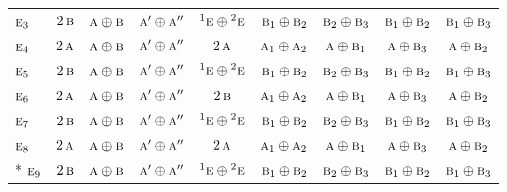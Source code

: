 \documentclass[10pt,a4paper]{article}
\numberwithin{equation}{section}
\newcommand{\irr}[1]{\text{\normalfont\scshape #1}}
\newcommand{\conjpair}[1]{{}^{#1}}
\begin{document}
{\begin{longtable}{@{}lcccccccc@{}}
$\irr{e}_{3}$ & $2\,\irr{b}$ & $\irr{a}\oplus \irr{b}$ & $\irr{a}'\oplus \irr{a}''$ & $\conjpair{1}\irr{e}\oplus \conjpair{2}\irr{e}$ & $\irr{b}_{1}\oplus \irr{b}_{2}$ & $\irr{b}_{2}\oplus \irr{b}_{3}$ & $\irr{b}_{1}\oplus \irr{b}_{2}$ & $\irr{b}_{1}\oplus \irr{b}_{3}$\\
$\irr{e}_{4}$ & $2\,\irr{a}$ & $\irr{a}\oplus \irr{b}$ & $\irr{a}'\oplus \irr{a}''$ & $2\,\irr{a}$ & $\irr{a}_{1}\oplus \irr{a}_{2}$ & $\irr{a}\oplus \irr{b}_{1}$ & $\irr{a}\oplus \irr{b}_{3}$ & $\irr{a}\oplus \irr{b}_{2}$\\
$\irr{e}_{5}$ & $2\,\irr{b}$ & $\irr{a}\oplus \irr{b}$ & $\irr{a}'\oplus \irr{a}''$ & $\conjpair{1}\irr{e}\oplus \conjpair{2}\irr{e}$ & $\irr{b}_{1}\oplus \irr{b}_{2}$ & $\irr{b}_{2}\oplus \irr{b}_{3}$ & $\irr{b}_{1}\oplus \irr{b}_{2}$ & $\irr{b}_{1}\oplus \irr{b}_{3}$\\
$\irr{e}_{6}$ & $2\,\irr{a}$ & $\irr{a}\oplus \irr{b}$ & $\irr{a}'\oplus \irr{a}''$ & $2\,\irr{b}$ & $\irr{a}_{1}\oplus \irr{a}_{2}$ & $\irr{a}\oplus \irr{b}_{1}$ & $\irr{a}\oplus \irr{b}_{3}$ & $\irr{a}\oplus \irr{b}_{2}$\\
$\irr{e}_{7}$ & $2\,\irr{b}$ & $\irr{a}\oplus \irr{b}$ & $\irr{a}'\oplus \irr{a}''$ & $\conjpair{1}\irr{e}\oplus \conjpair{2}\irr{e}$ & $\irr{b}_{1}\oplus \irr{b}_{2}$ & $\irr{b}_{2}\oplus \irr{b}_{3}$ & $\irr{b}_{1}\oplus \irr{b}_{2}$ & $\irr{b}_{1}\oplus \irr{b}_{3}$\\
$\irr{e}_{8}$ & $2\,\irr{a}$ & $\irr{a}\oplus \irr{b}$ & $\irr{a}'\oplus \irr{a}''$ & $2\,\irr{a}$ & $\irr{a}_{1}\oplus \irr{a}_{2}$ & $\irr{a}\oplus \irr{b}_{1}$ & $\irr{a}\oplus \irr{b}_{3}$ & $\irr{a}\oplus \irr{b}_{2}$\\*
$\irr{e}_{9}$ & $2\,\irr{b}$ & $\irr{a}\oplus \irr{b}$ & $\irr{a}'\oplus \irr{a}''$ & $\conjpair{1}\irr{e}\oplus \conjpair{2}\irr{e}$ & $\irr{b}_{1}\oplus \irr{b}_{2}$ & $\irr{b}_{2}\oplus \irr{b}_{3}$ & $\irr{b}_{1}\oplus \irr{b}_{2}$ & $\irr{b}_{1}\oplus \irr{b}_{3}$\\
\bottomrule\end{longtable}}
\end{document}
